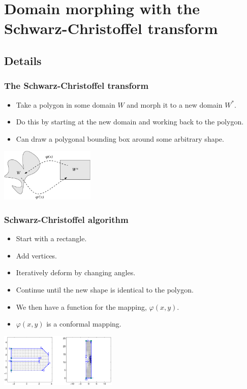 \documentclass[ignorenonframetext]{beamer} %
\newcommand{\bc}{\begin{center}}
\newcommand{\ec}{\end{center}}
\newcommand{\bi}{\begin{itemize}}
\newcommand{\ei}{\end{itemize}}
\begin{document}
\section{Domain morphing with the Schwarz-Christoffel transform}

\subsection{Details}

\begin{frame}
	\frametitle{The Schwarz-Christoffel transform}
       \bi
         \item Take a polygon in some domain $W$ and morph it to a new domain $W^*$.
         \item Do this by starting at the new domain and working back to the polygon.
         \item Can draw a polygonal bounding box around some arbitrary shape.
        \ei
        \bc
              \includegraphics[height=1in]{figs/mappingdia}
       \ec
\end{frame}


\begin{frame}
	\frametitle{Schwarz-Christoffel algorithm}
       \bi
         \item Start with a rectangle.
         \item Add vertices.
         \item Iteratively deform by changing angles.
         \item Continue until the new shape is identical to the polygon.
         \item We then have a function for the mapping, $\varphi(x,y)$.
         \item $\varphi(x,y)$ is a conformal mapping.
        \ei 
      \bc
         \includegraphics[height=1in]{figs/matlab-test-2}
      \ec
\end{frame}
\end{document}
